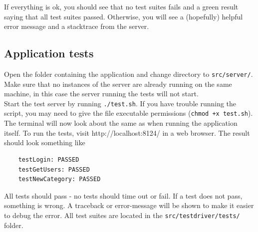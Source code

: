 \documentclass[a4paper, 12pt, titlepage]{article}
\begin{document}
	If everything is ok, you should see that no test suites fails and a green result saying that all test suites passed. Otherwise, you will see a (hopefully) helpful error message and a stacktrace from the server.

	\subsection{Application tests}
	Open the folder containing the application and change directory to \lstinline{src/server/}. Make sure that no instances of the server are already running on the same machine, in this case the server running the tests will not start.\\

	Start the test server by running \lstinline{./test.sh}. If you have trouble running the script, you may need to give the file executable permissions (\lstinline{chmod +x test.sh}).\\

	The terminal will now look about the same as when running the application itself. To run the tests, visit http://localhost:8124/ in a web browser. The result should look something like

	\begin{lstlisting}
	testLogin: PASSED
	testGetUsers: PASSED
	testNewCategory: PASSED
	\end{lstlisting}

	All tests should pass - no tests should time out or fail. If a test does not pass, something is wrong. A traceback or error-message will be shown to make it easier to debug the error. All test suites are located in the \lstinline{src/testdriver/tests/} folder. 
\end{document}
